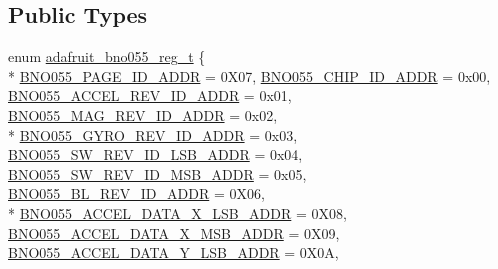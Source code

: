 \subsection*{Public Types}
\begin{DoxyCompactItemize}
\item 
enum \hyperlink{classAdafruit__BNO055_a37bdd791ec4916fb29933a5b78be0485}{adafruit\+\_\+bno055\+\_\+reg\+\_\+t} \{ \\*
\hyperlink{classAdafruit__BNO055_a37bdd791ec4916fb29933a5b78be0485a4335c5a431c79bdbaa90285529c55ad9}{B\+N\+O055\+\_\+\+P\+A\+G\+E\+\_\+\+I\+D\+\_\+\+A\+D\+DR} = 0\+X07, 
\hyperlink{classAdafruit__BNO055_a37bdd791ec4916fb29933a5b78be0485aa275fa7224eeaf5dee18716a4131e851}{B\+N\+O055\+\_\+\+C\+H\+I\+P\+\_\+\+I\+D\+\_\+\+A\+D\+DR} = 0x00, 
\hyperlink{classAdafruit__BNO055_a37bdd791ec4916fb29933a5b78be0485a149f2f8fc3fce4cfb0aefb815ef00a48}{B\+N\+O055\+\_\+\+A\+C\+C\+E\+L\+\_\+\+R\+E\+V\+\_\+\+I\+D\+\_\+\+A\+D\+DR} = 0x01, 
\hyperlink{classAdafruit__BNO055_a37bdd791ec4916fb29933a5b78be0485a746e1fc48d00c95444cc6842871e1799}{B\+N\+O055\+\_\+\+M\+A\+G\+\_\+\+R\+E\+V\+\_\+\+I\+D\+\_\+\+A\+D\+DR} = 0x02, 
\\*
\hyperlink{classAdafruit__BNO055_a37bdd791ec4916fb29933a5b78be0485ac3e24f4d9b0856d5adf453d48d212229}{B\+N\+O055\+\_\+\+G\+Y\+R\+O\+\_\+\+R\+E\+V\+\_\+\+I\+D\+\_\+\+A\+D\+DR} = 0x03, 
\hyperlink{classAdafruit__BNO055_a37bdd791ec4916fb29933a5b78be0485a6daa86f588765df194d98edcc3507442}{B\+N\+O055\+\_\+\+S\+W\+\_\+\+R\+E\+V\+\_\+\+I\+D\+\_\+\+L\+S\+B\+\_\+\+A\+D\+DR} = 0x04, 
\hyperlink{classAdafruit__BNO055_a37bdd791ec4916fb29933a5b78be0485acdf7f4b1082a3fcbc8d56f59e58ca4cc}{B\+N\+O055\+\_\+\+S\+W\+\_\+\+R\+E\+V\+\_\+\+I\+D\+\_\+\+M\+S\+B\+\_\+\+A\+D\+DR} = 0x05, 
\hyperlink{classAdafruit__BNO055_a37bdd791ec4916fb29933a5b78be0485a099f530e4e69326e7c56b9516bc58ab8}{B\+N\+O055\+\_\+\+B\+L\+\_\+\+R\+E\+V\+\_\+\+I\+D\+\_\+\+A\+D\+DR} = 0\+X06, 
\\*
\hyperlink{classAdafruit__BNO055_a37bdd791ec4916fb29933a5b78be0485a3eec9ae5c1e3ac26884285a04463b5a0}{B\+N\+O055\+\_\+\+A\+C\+C\+E\+L\+\_\+\+D\+A\+T\+A\+\_\+\+X\+\_\+\+L\+S\+B\+\_\+\+A\+D\+DR} = 0\+X08, 
\hyperlink{classAdafruit__BNO055_a37bdd791ec4916fb29933a5b78be0485aed5c07c001912e9747475a3ae7f757f6}{B\+N\+O055\+\_\+\+A\+C\+C\+E\+L\+\_\+\+D\+A\+T\+A\+\_\+\+X\+\_\+\+M\+S\+B\+\_\+\+A\+D\+DR} = 0\+X09, 
\hyperlink{classAdafruit__BNO055_a37bdd791ec4916fb29933a5b78be0485a1a0f230da78da7741f7d084d1ff11c85}{B\+N\+O055\+\_\+\+A\+C\+C\+E\+L\+\_\+\+D\+A\+T\+A\+\_\+\+Y\+\_\+\+L\+S\+B\+\_\+\+A\+D\+DR} = 0\+X0A, 

\end{DoxyCompactItemize}
